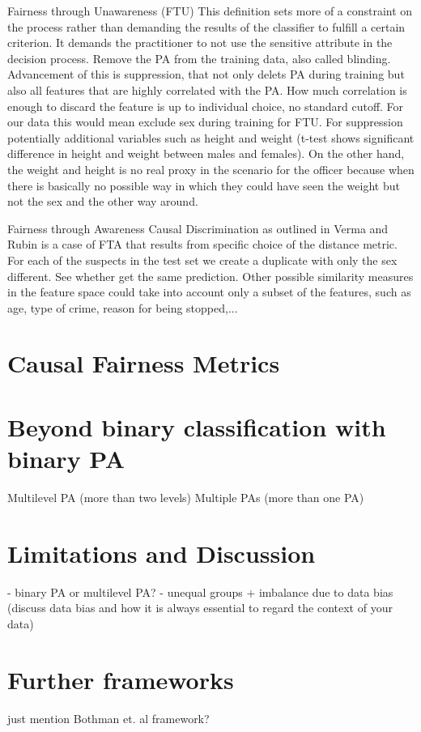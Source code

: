 \documentclass{article}
\begin{document}
Fairness through Unawareness (FTU)
This definition sets more of a constraint on the process rather than demanding the results of the classifier to fulfill a certain criterion. It demands the practitioner to not use the sensitive attribute in the decision process. Remove the PA from the training data, also called blinding.
Advancement of this is suppression, that not only delets PA during training but also all features that are highly correlated with the PA. How much correlation is enough to discard the feature is up to individual choice, no standard cutoff. For our data this would mean exclude sex during training for FTU. For suppression potentially additional variables such as height and weight (t-test shows significant difference in height and weight between males and females). On the other hand, the weight and height is no real proxy in the scenario for the officer because when there is basically no possible way in which they could have seen the weight but not the sex and the other way around.

Fairness through Awareness
Causal Discrimination as outlined in Verma and Rubin is a case of FTA that results from specific choice of the distance metric.
For each of the suspects in the test set we create a duplicate with only the sex different. See whether get the same prediction. Other possible similarity measures in the feature space could take into account only a subset of the features, such as age, type of crime, reason for being stopped,...

\section{Causal Fairness Metrics}



\section{Beyond binary classification with binary PA}
Multilevel PA (more than two levels)
Multiple PAs (more than one PA)

\section{Limitations and Discussion}
- binary PA or multilevel PA?
- unequal groups + imbalance due to data bias (discuss data bias and how it is always essential to regard the context of your data)

\section{Further frameworks}
just mention Bothman et. al framework?
\end{document}
